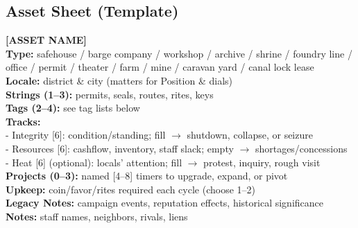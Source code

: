 \documentclass[10pt]{article}
\begin{document}
\begin{center}
    \subsection{Asset Sheet (Template)}
    \begin{framed}
    \noindent\textbf{[ASSET NAME]}\\
    \textbf{Type:} safehouse / barge company / workshop / archive / shrine / foundry line / office / permit / theater / farm / mine / caravan yard / canal lock lease\\
    \textbf{Locale:} district \& city (matters for Position \& dials)\\
    \textbf{Strings (1--3):} permits, seals, routes, rites, keys\\
    \textbf{Tags (2--4):} see tag lists below\\
    \textbf{Tracks:}\\
    \hspace{10pt}- Integrity [6]: condition/standing; fill $\rightarrow$ shutdown, collapse, or seizure\\
    \hspace{10pt}- Resources [6]: cashflow, inventory, staff slack; empty $\rightarrow$ shortages/concessions\\
    \hspace{10pt}- Heat [6] (optional): locals' attention; fill $\rightarrow$ protest, inquiry, rough visit\\
    \textbf{Projects (0--3):} named [4--8] timers to upgrade, expand, or pivot\\
    \textbf{Upkeep:} coin/favor/rites required each cycle (choose 1--2)\\
    \textbf{Legacy Notes:} campaign events, reputation effects, historical significance\\
    \textbf{Notes:} staff names, neighbors, rivals, liens
    \end{framed}
    

\end{center}
\end{document}
